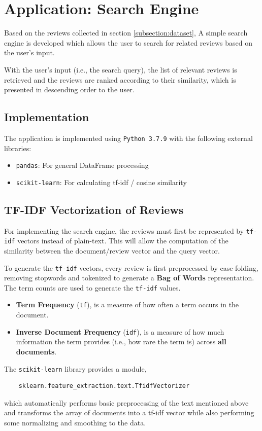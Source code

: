 \documentclass[sigconf,nonacm=true]{acmart}
\begin{document}
\section{Application: Search Engine}
\label{section:label}
Based on the reviews collected in section \ref{subsection:dataset}, A simple search
engine is developed which allows the user to search for related reviews
based on the user's input.

With the user's input (i.e., the search query), the list
of relevant reviews is retrieved and the reviews are ranked according
to their similarity, which is presented in descending order to the user.

\subsection{Implementation}
The application is implemented using \verb|Python 3.7.9| with the following external
libraries:
\begin{itemize}
	\item {\verb|pandas|}: For general DataFrame processing
	\item {\verb|scikit-learn|}: For calculating tf-idf / cosine similarity
\end{itemize}


\subsection{TF-IDF Vectorization of Reviews}
For implementing the search engine, the reviews must first be represented by
\verb|tf-idf| vectors instead of plain-text. This will allow the computation
of the similarity between the document/review vector and the query vector.

To generate the \verb|tf-idf| vectors, every review is first preprocessed by 
case-folding, removing stopwords and tokenized to generate a 
\textbf{Bag of Words} representation. The term counts are used to generate the
\verb|tf-idf| values.
\begin{itemize}
	\item \textbf{Term Frequency} (\verb|tf|), is a measure of how often a term occurs
	in the document.
	\item \textbf{Inverse Document Frequency} (\verb|idf|), is a measure of how much
	information the term provides (i.e., how rare the term is) across
	\textbf{all documents}.
\end{itemize}
The \verb|scikit-learn| library provides a module,
\begin{verbatim}
	sklearn.feature_extraction.text.TfidfVectorizer
\end{verbatim}
which automatically performs basic preprocessing of the text mentioned above and
transforms the array of documents into a tf-idf vector while also performing some
normalizing and smoothing to the data.
\end{document}
